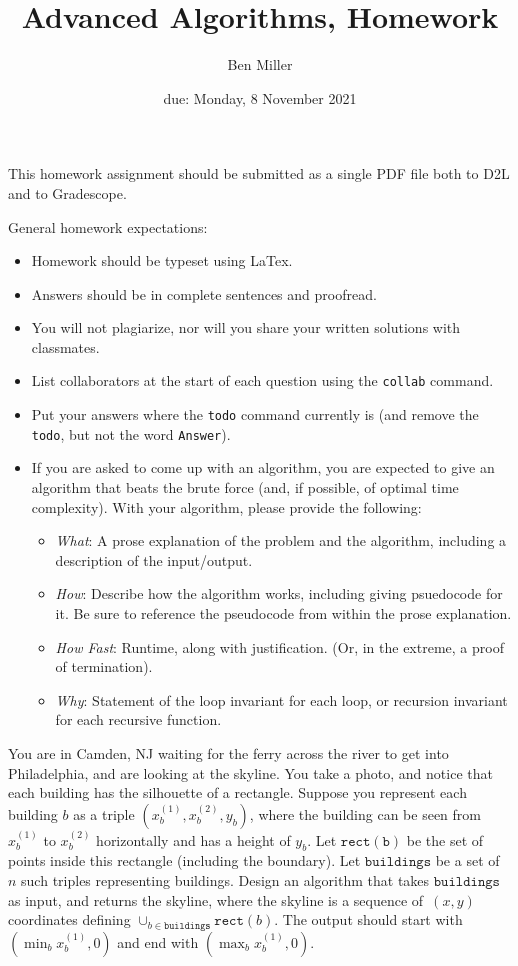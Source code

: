 \documentclass{article}
\title{Advanced Algorithms, Homework \hwnum}
\author{Ben Miller}
\date{due: Monday, 8 November 2021}
\begin{document}
\maketitle

This homework assignment should be
submitted as a single PDF file both to D2L and to Gradescope.

General homework expectations:
\begin{itemize}
    \item Homework should be typeset using LaTex.
    \item Answers should be in complete sentences and proofread.
    \item You will not plagiarize, nor will you share your written solutions
        with classmates.
    \item List collaborators at the start of each question using the
        \texttt{collab} command.
    \item Put your answers where the \texttt{todo} command currently is (and
        remove the \texttt{todo}, but not the word \texttt{Answer}).
    \item If you are asked to come up with an algorithm, you are
        expected to give an algorithm that beats the brute force (and, if possible, of
        optimal time complexity). With your algorithm, please provide the following:
        \begin{itemize}
            \item \emph{What}: A prose explanation of the problem and the algorithm,
                including a description of the input/output.
            \item \emph{How}: Describe how the algorithm works, including giving
                psuedocode for it.  Be sure to reference the pseudocode
                from within the prose explanation.
            \item \emph{How Fast}: Runtime, along with justification.  (Or, in the
                extreme, a proof of termination).
            \item \emph{Why}: Statement of the loop invariant for each loop, or
                recursion invariant for each recursive function.
        \end{itemize}
\end{itemize}

\collab{}

You are in Camden, NJ waiting for the ferry across the river to
get into Philadelphia, and are looking at the skyline.  You take a photo, and notice that each building
has the silhouette of a rectangle.  Suppose you  represent each building $b$ as a
triple $(x_b^{(1)},x_b^{(2)},y_b)$, where the building can be seen from $x_b^{(1)}$ to $x_b^{(2)}$
horizontally and has a height of $y_b$.  Let $\mathtt{rect(b)}$ be the set of
points inside this rectangle (including the boundary).  Let $\mathtt{buildings}$
be a set of $n$ such triples representing buildings. Design an algorithm that takes $\mathtt{buildings}$ as input, and
returns the skyline, where the skyline is a sequence of~$(x,y)$ coordinates
defining $\cup_{b \in \mathtt{buildings}} \mathtt{rect}(b)$.  The output should
start with $(\min_b{x_b^{(1)}},0)$ and end with $(\max_b{x_b^{(1)}},0)$.
\end{document}
